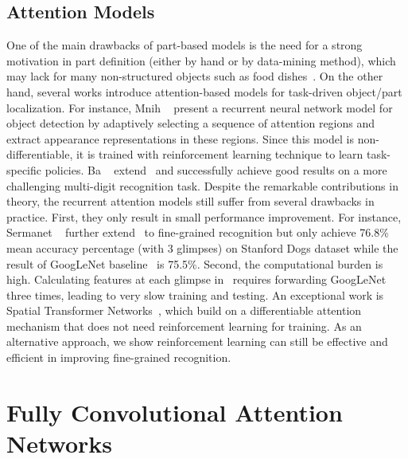 \documentclass[10pt,twocolumn,letterpaper]{article}
\begin{document}
\subsection{Attention Models}
One of the main drawbacks of part-based models is the need for a strong motivation in part definition (either by hand or by data-mining method), which may lack for many non-structured objects such as food dishes~\cite{krause2016unreasonable}.
On the other hand, several works introduce attention-based models for task-driven object/part localization.
For instance, Mnih \etal~\cite{mnih2014recurrent} present a recurrent neural network model for object detection by adaptively selecting a sequence of attention regions and extract appearance representations in these regions.
Since this model is non-differentiable, it is trained with reinforcement learning technique to learn task-specific policies.
Ba \etal~\cite{ba2014multiple} extend~\cite{mnih2014recurrent} and successfully achieve good results on a more challenging multi-digit recognition task.
Despite the remarkable contributions in theory, the recurrent attention models still suffer from several drawbacks in practice.
First, they only result in small performance improvement.
For instance, Sermanet \etal~\cite{sermanet2014attention} further extend~\cite{ba2014multiple} to fine-grained recognition but only achieve 76.8\% mean accuracy percentage (with 3 glimpses) on Stanford Dogs dataset while the result of GoogLeNet baseline~\cite{szegedy2015going} is 75.5\%.
Second, the computational burden is high.
Calculating features at each glimpse in~\cite{sermanet2014attention} requires forwarding GoogLeNet three times, leading to very slow training and testing.
An exceptional work is Spatial Transformer Networks~\cite{jaderberg2015spatial}, which build on a differentiable attention mechanism that does not need reinforcement learning for training.
As an alternative approach, we show reinforcement learning can still be effective and efficient in improving fine-grained recognition.






\section{Fully Convolutional Attention Networks}
\end{document}
